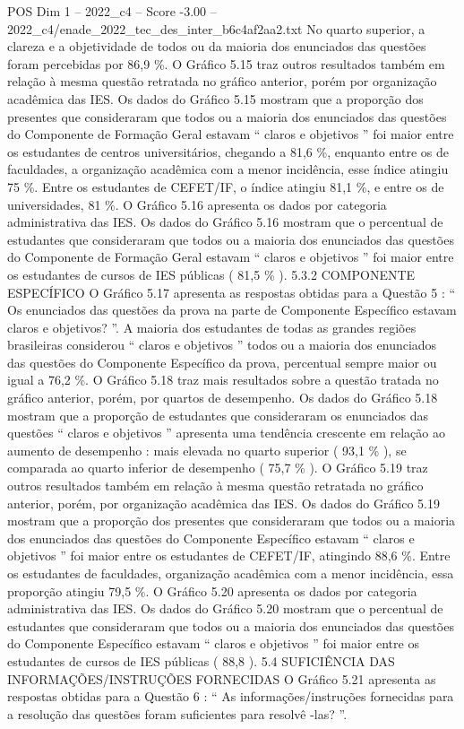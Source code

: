 \begin{textsample}{POS Dim 1 – 2022\_c4 – Score -3.00 – 2022\_c4/enade\_2022\_tec\_des\_inter\_b6c4af2aa2.txt}
No quarto superior, a clareza e a objetividade de todos ou da maioria dos enunciados das questões foram percebidas por 86,9 \%.
O Gráfico 5.15 traz outros resultados também em relação à mesma questão retratada no gráfico anterior, porém por organização acadêmica das IES.
Os dados do Gráfico 5.15 mostram que a proporção dos presentes que consideraram que todos ou a maioria dos enunciados das questões do Componente de Formação Geral estavam “ claros e objetivos ” foi maior entre os estudantes de centros universitários, chegando a 81,6 \%, enquanto entre os de faculdades, a organização acadêmica com a menor incidência, esse índice atingiu 75 \%.
Entre os estudantes de CEFET/IF, o índice atingiu 81,1 \%, e entre os de universidades, 81 \%.
O Gráfico 5.16 apresenta os dados por categoria administrativa das IES.
Os dados do Gráfico 5.16 mostram que o percentual de estudantes que consideraram que todos ou a maioria dos enunciados das questões do Componente de Formação Geral estavam “ claros e objetivos ” foi maior entre os estudantes de cursos de IES públicas ( 81,5 \% ). 5.3.2 COMPONENTE ESPECÍFICO O Gráfico 5.17 apresenta as respostas obtidas para a Questão 5 : “ Os enunciados das questões da prova na parte de Componente Específico estavam claros e objetivos? ”.
A maioria dos estudantes de todas as grandes regiões brasileiras considerou “ claros e objetivos ” todos ou a maioria dos enunciados das questões do Componente Específico da prova, percentual sempre maior ou igual a 76,2 \%.
O Gráfico 5.18 traz mais resultados sobre a questão tratada no gráfico anterior, porém, por quartos de desempenho.
Os dados do Gráfico 5.18 mostram que a proporção de estudantes que consideraram os enunciados das questões “ claros e objetivos ” apresenta uma tendência crescente em relação ao aumento de desempenho : mais elevada no quarto superior ( 93,1 \% ), se comparada ao quarto inferior de desempenho ( 75,7 \% ).
O Gráfico 5.19 traz outros resultados também em relação à mesma questão retratada no gráfico anterior, porém, por organização acadêmica das IES.
Os dados do Gráfico 5.19 mostram que a proporção dos presentes que consideraram que todos ou a maioria dos enunciados das questões do Componente Específico estavam “ claros e objetivos ” foi maior entre os estudantes de CEFET/IF, atingindo 88,6 \%.
Entre os estudantes de faculdades, organização acadêmica com a menor incidência, essa proporção atingiu 79,5 \%.
O Gráfico 5.20 apresenta os dados por categoria administrativa das IES.
Os dados do Gráfico 5.20 mostram que o percentual de estudantes que consideraram que todos ou a maioria dos enunciados das questões do Componente Específico estavam “ claros e objetivos ” foi maior entre os estudantes de cursos de IES públicas ( 88,8 ). 5.4 SUFICIÊNCIA DAS INFORMAÇÕES/INSTRUÇÕES FORNECIDAS O Gráfico 5.21 apresenta as respostas obtidas para a Questão 6 : “ As informações/instruções fornecidas para a resolução das questões foram suficientes para resolvê -las? ”.

\end{textsample}

